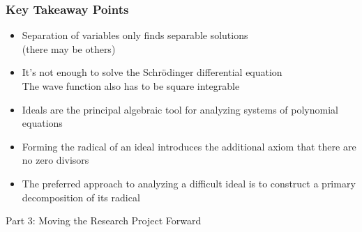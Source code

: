 \documentclass{beamer}
\begin{document}
\begin{frame}
\frametitle{Key Takeaway Points}
\begin{itemize}
\item Separation of variables only finds separable solutions\\ (there may be others)
\item It's not enough to solve the Schr\"odinger differential equation\\The wave function also has to be square integrable
\item Ideals are the principal algebraic tool for analyzing systems of polynomial equations
\item Forming the radical of an ideal introduces the additional axiom that there are no zero divisors
\item The preferred approach to analyzing a difficult ideal
is to construct a primary decomposition of its radical
\end{itemize}
\end{frame}

\begin{frame}
\begin{exampleblock}{}
\begin{center}
\vskip 20pt
\Huge
Part 3: Moving the Research Project Forward
\vskip 6pt
\ 
\end{center}
\end{exampleblock}
\end{frame}
\end{document}
